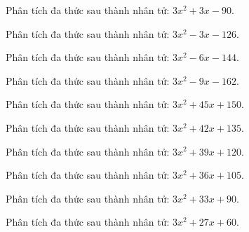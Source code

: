 \begin{bt}
	Phân tích đa thức sau thành nhân tử: $3 x^2 + 3 x - 90$.
\end{bt}
\begin{bt}
	Phân tích đa thức sau thành nhân tử: $3 x^2 - 3 x - 126$.
\end{bt}
\begin{bt}
	Phân tích đa thức sau thành nhân tử: $3 x^2 - 6 x - 144$.
\end{bt}
\begin{bt}
	Phân tích đa thức sau thành nhân tử: $3 x^2 - 9 x - 162$.
\end{bt}
\begin{bt}
	Phân tích đa thức sau thành nhân tử: $3 x^2 + 45 x + 150$.
\end{bt}
\begin{bt}
	Phân tích đa thức sau thành nhân tử: $3 x^2 + 42 x + 135$.
\end{bt}
\begin{bt}
	Phân tích đa thức sau thành nhân tử: $3 x^2 + 39 x + 120$.
\end{bt}
\begin{bt}
	Phân tích đa thức sau thành nhân tử: $3 x^2 + 36 x + 105$.
\end{bt}
\begin{bt}
	Phân tích đa thức sau thành nhân tử: $3 x^2 + 33 x + 90$.
\end{bt}
\begin{bt}
	Phân tích đa thức sau thành nhân tử: $3 x^2 + 27 x + 60$.
\end{bt}
